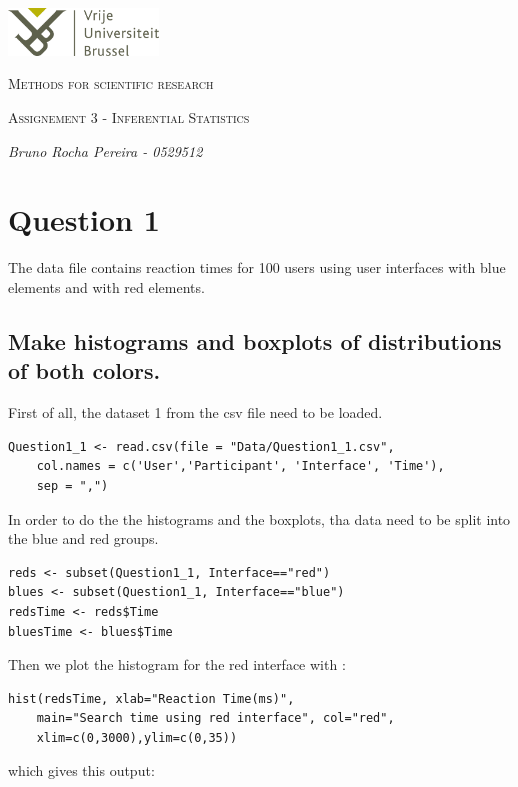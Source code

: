 \documentclass[12pt,a4paper]{scrartcl}
\begin{document}
\begin{titlepage}
    \centering
    \includegraphics[width=0.30\textwidth]{VUB.png}\par\vspace{1cm}
    {\scshape\Large Methods for scientific research\par}
    \vspace{1cm}
    {\scshape\Large Assignement 3 - Inferential Statistics\par}
    \vspace{1.5cm}
    {\Large\itshape Bruno Rocha Pereira - 0529512\par}
    \vfill
\end{titlepage}

\section{Question 1}
The data file contains reaction times for 100 users using user interfaces
with blue elements and with red elements.
\subsection{Make histograms and boxplots of distributions of both colors.}
First of all, the dataset 1 from the csv file need to be loaded.
\begin{lstlisting}[frame=single]
Question1_1 <- read.csv(file = "Data/Question1_1.csv", 
    col.names = c('User','Participant', 'Interface', 'Time'), 
    sep = ",")
\end{lstlisting}

In order to do the the histograms and the boxplots, tha data need to be split into the blue and red groups.
\begin{lstlisting}[frame=single]
reds <- subset(Question1_1, Interface=="red")
blues <- subset(Question1_1, Interface=="blue")
redsTime <- reds$Time
bluesTime <- blues$Time
\end{lstlisting}
Then we plot the histogram for the red interface with :

\begin{lstlisting}[frame=single]
hist(redsTime, xlab="Reaction Time(ms)", 
    main="Search time using red interface", col="red",
    xlim=c(0,3000),ylim=c(0,35))
\end{lstlisting}
which gives this output:
\end{document}
